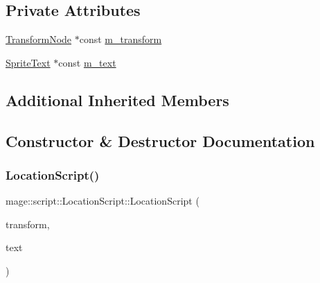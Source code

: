 \subsection*{Private Attributes}
\begin{DoxyCompactItemize}
\item 
\hyperlink{classmage_1_1_transform_node}{Transform\+Node} $\ast$const \hyperlink{classmage_1_1script_1_1_location_script_a29332082b8b4b7d9c0d567ea7a79eec3}{m\+\_\+transform}
\item 
\hyperlink{classmage_1_1_sprite_text}{Sprite\+Text} $\ast$const \hyperlink{classmage_1_1script_1_1_location_script_ab03912d70a8bcb3a682edc9081808e7a}{m\+\_\+text}
\end{DoxyCompactItemize}
\subsection*{Additional Inherited Members}


\subsection{Constructor \& Destructor Documentation}
\hypertarget{classmage_1_1script_1_1_location_script_a50b18f8158e33831907e7299bff9e499}{}\label{classmage_1_1script_1_1_location_script_a50b18f8158e33831907e7299bff9e499} 
\subsubsection{\texorpdfstring{Location\+Script()}{LocationScript()}\hspace{0.1cm}{\footnotesize\ttfamily [1/3]}}
{\footnotesize\ttfamily mage\+::script\+::\+Location\+Script\+::\+Location\+Script (\begin{DoxyParamCaption}\item[{\hyperlink{classmage_1_1_transform_node}{Transform\+Node} $\ast$}]{transform,  }\item[{\hyperlink{classmage_1_1_sprite_text}{Sprite\+Text} $\ast$}]{text }\end{DoxyParamCaption})\hspace{0.3cm}{\ttfamily [explicit]}}

\hypertarget{classmage_1_1script_1_1_location_script_a66168c494360caf2b9e6363c47f8f15d}{}\label{classmage_1_1script_1_1_location_script_a66168c494360caf2b9e6363c47f8f15d} 
